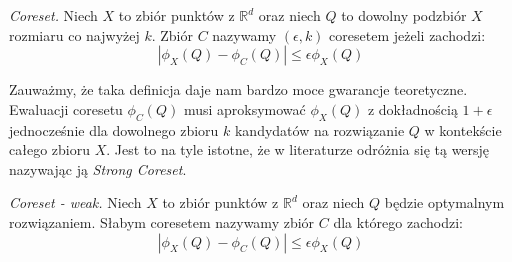 \begin{definition}
    \emph{Coreset.} Niech $X$ to zbiór punktów z $\mathbb{R}^{d}$ oraz niech $Q$ to dowolny podzbiór $X$ rozmiaru co najwyżej $k$. 
    Zbiór $C$ nazywamy $(\epsilon, k)$ coresetem jeżeli zachodzi:
    \begin{equation}
        |\phi_{X}(Q) - \phi_{C}(Q)| \leq \epsilon\phi_{X}(Q)
    \end{equation}
\end{definition}

\noindent
Zauważmy, że taka definicja daje nam bardzo moce gwarancje teoretyczne.
Ewaluacji coresetu $\phi_{C}(Q)$ musi aproksymować $\phi_{X}(Q)$ z dokładnością $1+\epsilon$ jednocześnie dla dowolnego zbioru $k$ kandydatów na rozwiązanie $Q$ w kontekście całego zbioru $X$.
Jest to na tyle istotne, że w literaturze odróżnia się tą wersję nazywając ją \textit{Strong Coreset}.

\begin{definition}
    \emph{Coreset - weak.} Niech $X$ to zbiór punktów z $\mathbb{R}^{d}$ oraz niech $Q$ będzie optymalnym rozwiązaniem.
    Słabym coresetem nazywamy zbiór $C$ dla którego zachodzi:
    \begin{equation}
        |\phi_{X}(Q) - \phi_{C}(Q)| \leq \epsilon\phi_{X}(Q)
    \end{equation}
\end{definition}